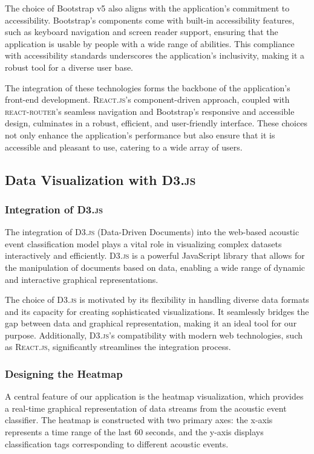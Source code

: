 The choice of Bootstrap v5 also aligns with the application’s commitment to accessibility. Bootstrap’s components come with built-in accessibility features, such as keyboard navigation and screen reader support, ensuring that the application is usable by people with a wide range of abilities. This compliance with accessibility standards underscores the application's inclusivity, making it a robust tool for a diverse user base.

The integration of these technologies forms the backbone of the application's front-end development. \textsc{React.js}'s component-driven approach, coupled with \textsc{react-router}'s seamless navigation and Bootstrap's responsive and accessible design, culminates in a robust, efficient, and user-friendly interface. These choices not only enhance the application's performance but also ensure that it is accessible and pleasant to use, catering to a wide array of users.

\subsection{Data Visualization with \textsc{D3.js}}
\subsubsection{Integration of \textsc{D3.js}}
The integration of \textsc{D3.js} (Data-Driven Documents) into the web-based acoustic event classification model plays a vital role in visualizing complex datasets interactively and efficiently\cite{rothenhausler2022d3}. \textsc{D3.js} is a powerful JavaScript library that allows for the manipulation of documents based on data, enabling a wide range of dynamic and interactive graphical representations.

The choice of \textsc{D3.js} is motivated by its flexibility in handling diverse data formats and its capacity for creating sophisticated visualizations. It seamlessly bridges the gap between data and graphical representation, making it an ideal tool for our purpose. Additionally, \textsc{D3.js}'s compatibility with modern web technologies, such as \textsc{React.js}, significantly streamlines the integration process.

\subsubsection{Designing the Heatmap}
A central feature of our application is the heatmap visualization, which provides a real-time graphical representation of data streams from the acoustic event classifier. The heatmap is constructed with two primary axes: the x-axis represents a time range of the last 60 seconds, and the y-axis displays classification tags corresponding to different acoustic events.

